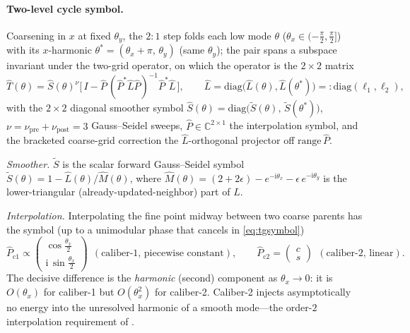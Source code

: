 \documentclass[leqno,letterpaper]{etna}
\begin{document}
\paragraph{Two-level cycle symbol.}
Coarsening in $x$ at fixed $\theta_y$, the $2{:}1$ step folds each low mode $\theta$ ($\theta_x\in(-\tfrac\pi2,\tfrac\pi2]$) with its $x$-harmonic $\theta^{\ast}=(\theta_x{+}\pi,\,\theta_y)$ (same $\theta_y$); the pair spans a subspace invariant under the two-grid operator, on which the operator is the $2\times2$ matrix
\begin{equation}\label{eq:tgsymbol}
\hat T(\theta)=\hat S(\theta)^{\nu}\Big[\,I-\hat P\,(\hat P^{\ast}\hat L\hat P)^{-1}\hat P^{\ast}\hat L\,\Big],\qquad
\hat L=\mathrm{diag}\big(\hat L(\theta),\hat L(\theta^{\ast})\big)=:\mathrm{diag}(\ell_1,\ell_2),
\end{equation}
with the $2\times2$ diagonal smoother symbol $\hat S(\theta)=\mathrm{diag}\big(\tilde S(\theta),\,\tilde S(\theta^{\ast})\big)$,
$\nu=\nu_{\mathrm{pre}}{+}\nu_{\mathrm{post}}=3$ Gauss--Seidel sweeps, $\hat P\in\mathbb C^{2\times1}$ the
interpolation symbol, and the bracketed coarse-grid correction the $\hat L$-orthogonal projector off
$\mathrm{range}\,\hat P$.

\emph{Smoother.} $\tilde S$ is the scalar forward Gauss--Seidel symbol $\tilde S(\theta)=1-\hat L(\theta)/\hat M(\theta)$,
where $\hat M(\theta)=(2{+}2\epsilon)-e^{-\mathrm{i}\theta_x}-\epsilon\,e^{-\mathrm{i}\theta_y}$ is the
lower-triangular (already-updated-neighbor) part of $L$.

\emph{Interpolation.} Interpolating the fine point midway between two coarse parents has the symbol (up to a
unimodular phase that cancels in \eqref{eq:tgsymbol})
\begin{equation}\label{eq:Psymbols}
\hat P_{\mathrm{c1}}\propto\begin{pmatrix}\cos\tfrac{\theta_x}{2}\\[2pt]\mathrm{i}\,\sin\tfrac{\theta_x}{2}\end{pmatrix}
\ \ (\text{caliber-1, piecewise constant}),\qquad
\hat P_{\mathrm{c2}}=\begin{pmatrix}c\\ s\end{pmatrix}\ \ (\text{caliber-2, linear}).
\end{equation}
The decisive difference is the \emph{harmonic} (second) component as $\theta_x\to0$: it is $O(\theta_x)$ for caliber-1 but $O(\theta_x^2)$ for caliber-2. Caliber-2 injects asymptotically no energy into the unresolved harmonic of a smooth mode---the order-$2$ interpolation requirement of \cite[\S4.3]{guide}.
\end{document}
